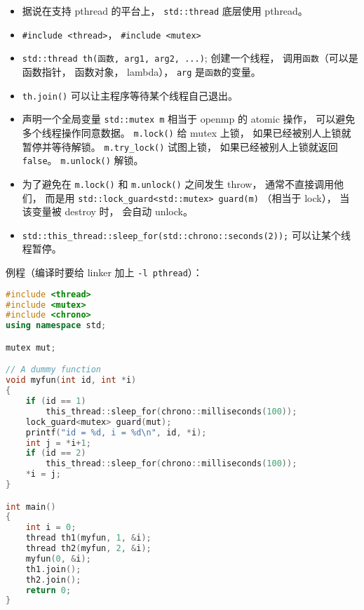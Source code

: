 
\begin{itemize}
\item 据说在支持 pthread 的平台上， \verb|std::thread| 底层使用 pthread。
\item \verb|#include <thread>|， \verb|#include <mutex>|
\item \verb|std::thread th(函数, arg1, arg2, ...)|; 创建一个线程， 调用\verb|函数|（可以是函数指针， 函数对象， lambda）， \verb|arg| 是\verb|函数|的变量。
\item \verb|th.join()| 可以让主程序等待某个线程自己退出。
\item 声明一个全局变量 \verb|std::mutex m| 相当于 openmp 的 atomic 操作， 可以避免多个线程操作同意数据。 \verb|m.lock()| 给 mutex 上锁， 如果已经被别人上锁就暂停并等待解锁。 \verb|m.try_lock()| 试图上锁， 如果已经被别人上锁就返回 \verb|false|。 \verb|m.unlock()| 解锁。
\item 为了避免在 \verb|m.lock()| 和 \verb|m.unlock()| 之间发生 throw， 通常不直接调用他们， 而是用 \verb|std::lock_guard<std::mutex> guard(m)| （相当于 lock）， 当该变量被 destroy 时， 会自动 unlock。
\item \verb|std::this_thread::sleep_for(std::chrono::seconds(2));| 可以让某个线程暂停。
\end{itemize}

例程（编译时要给 linker 加上 \verb|-l pthread|）：
\begin{lstlisting}[language=cpp]
#include <thread>
#include <mutex>
#include <chrono>
using namespace std;

mutex mut;

// A dummy function
void myfun(int id, int *i)
{
    if (id == 1)
        this_thread::sleep_for(chrono::milliseconds(100));
    lock_guard<mutex> guard(mut);
    printf("id = %d, i = %d\n", id, *i);
    int j = *i+1;
    if (id == 2)
        this_thread::sleep_for(chrono::milliseconds(100));
    *i = j;
}

int main()
{
    int i = 0;
    thread th1(myfun, 1, &i);
    thread th2(myfun, 2, &i);
    myfun(0, &i);
    th1.join();
    th2.join();
    return 0;
}
\end{lstlisting}

